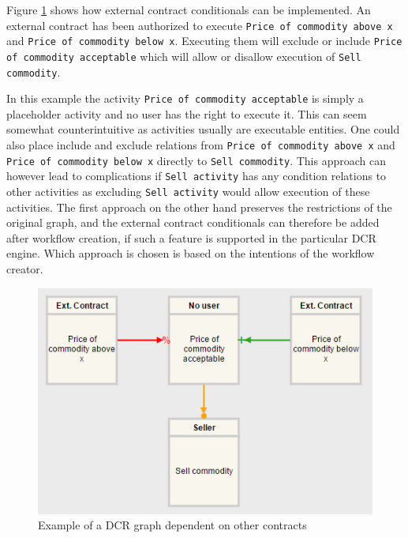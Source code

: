 \documentclass{article}
\begin{document}
			Figure \ref{fig:external-contract-conditionals} shows how external contract conditionals can be implemented. 
			An external contract has been authorized to execute \texttt{Price of commodity above x} and \texttt{Price of commodity below x}. 
			Executing them will exclude or include \texttt{Price of commodity acceptable} which will allow or disallow execution of \texttt{Sell commodity}.
			
			In this example the activity \texttt{Price of commodity acceptable} is simply a placeholder activity and no user has the right to execute it.
			This can seem somewhat counterintuitive as activities usually are executable entities. 
			One could also place include and exclude relations from \texttt{Price of commodity above x} and \texttt{Price of commodity below x} directly to \texttt{Sell commodity}.
			This approach can however lead to complications if \texttt{Sell activity} has any condition relations to other activities as excluding \texttt{Sell activity} would allow execution of these activities.
			The first approach on the other hand preserves the restrictions of the original graph, and the external contract conditionals can therefore be added after workflow creation, if such a feature is supported in the particular DCR engine.
			Which approach is chosen is based on the intentions of the workflow creator.

			\begin{figure}[!ht]
				\centering
				\includegraphics[scale=0.7]{figures/external-contract-conditionals.png}
			 	\caption[External contract conditionals]
			 	{Example of a DCR graph dependent on other contracts}
			 	\label{fig:external-contract-conditionals}
			\end{figure}
\end{document}
